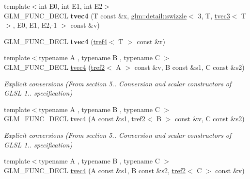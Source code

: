 \begin{DoxyCompactItemize}
\item 
\hypertarget{structglm_1_1detail_1_1tvec4_ac8d88c6d34185e88a78cd496114fff8f}{{\footnotesize template$<$int \-E0, int \-E1, int \-E2$>$ }\\\-G\-L\-M\-\_\-\-F\-U\-N\-C\-\_\-\-D\-E\-C\-L {\bfseries tvec4} (\-T const \&x, \hyperlink{structglm_1_1detail_1_1swizzle}{glm\-::detail\-::swizzle}$<$ 3, \-T, \hyperlink{structglm_1_1detail_1_1tvec3}{tvec3}$<$ \-T $>$, \-E0, \-E1, \-E2,-\/1 $>$ const \&v)}\label{structglm_1_1detail_1_1tvec4_ac8d88c6d34185e88a78cd496114fff8f}

\item 
\hypertarget{structglm_1_1detail_1_1tvec4_aac672cccaaf55ba163763d7bde03b956}{\-G\-L\-M\-\_\-\-F\-U\-N\-C\-\_\-\-D\-E\-C\-L {\bfseries tvec4} (\hyperlink{structglm_1_1detail_1_1tref4}{tref4}$<$ \-T $>$ const \&r)}\label{structglm_1_1detail_1_1tvec4_aac672cccaaf55ba163763d7bde03b956}

\item 
\hypertarget{structglm_1_1detail_1_1tvec4_a4965e30cabe5201ff1f26ce8598b29de}{{\footnotesize template$<$typename A , typename B , typename C $>$ }\\\-G\-L\-M\-\_\-\-F\-U\-N\-C\-\_\-\-D\-E\-C\-L \hyperlink{structglm_1_1detail_1_1tvec4_a4965e30cabe5201ff1f26ce8598b29de}{tvec4} (\hyperlink{structglm_1_1detail_1_1tref2}{tref2}$<$ \-A $>$ const \&v, \-B const \&s1, \-C const \&s2)}\label{structglm_1_1detail_1_1tvec4_a4965e30cabe5201ff1f26ce8598b29de}

\begin{DoxyCompactList}\small\item\em \-Explicit conversions (\-From section 5.. \-Conversion and scalar constructors of \-G\-L\-S\-L 1.. specification) \end{DoxyCompactList}\item 
\hypertarget{structglm_1_1detail_1_1tvec4_a7a668eac64d210f203a857e768e8eccd}{{\footnotesize template$<$typename A , typename B , typename C $>$ }\\\-G\-L\-M\-\_\-\-F\-U\-N\-C\-\_\-\-D\-E\-C\-L \hyperlink{structglm_1_1detail_1_1tvec4_a7a668eac64d210f203a857e768e8eccd}{tvec4} (\-A const \&s1, \hyperlink{structglm_1_1detail_1_1tref2}{tref2}$<$ \-B $>$ const \&v, \-C const \&s2)}\label{structglm_1_1detail_1_1tvec4_a7a668eac64d210f203a857e768e8eccd}

\begin{DoxyCompactList}\small\item\em \-Explicit conversions (\-From section 5.. \-Conversion and scalar constructors of \-G\-L\-S\-L 1.. specification) \end{DoxyCompactList}\item 
\hypertarget{structglm_1_1detail_1_1tvec4_a5cb8465f83dc0c2001ebfce68b48d67d}{{\footnotesize template$<$typename A , typename B , typename C $>$ }\\\-G\-L\-M\-\_\-\-F\-U\-N\-C\-\_\-\-D\-E\-C\-L \hyperlink{structglm_1_1detail_1_1tvec4_a5cb8465f83dc0c2001ebfce68b48d67d}{tvec4} (\-A const \&s1, \-B const \&s2, \hyperlink{structglm_1_1detail_1_1tref2}{tref2}$<$ \-C $>$ const \&v)}\label{structglm_1_1detail_1_1tvec4_a5cb8465f83dc0c2001ebfce68b48d67d}


\end{DoxyCompactItemize}
